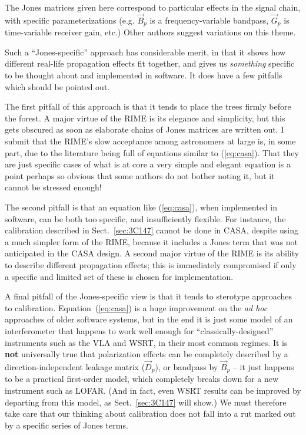 \documentclass[]{aa}
\newcommand{\jones}[2]{\vec {#1}_{#2}}
\begin{document}
The Jones matrices given here correspond to particular effects in the signal chain, with specific parameterizations (e.g. $\jones{B}{p}$ is a frequency-variable bandpass, $\jones{G}{p}$ is time-variable receiver gain, etc.) Other authors \citep{Rau:DDEs} suggest variations on this theme. 

Such a ``Jones-specific'' approach has considerable merit, in that it shows how different real-life propagation effects fit together, and gives us {\em something} specific to be thought about and implemented in software. It does have a few pitfalls which should be pointed out.

The first pitfall of this approach is that it tends to place the trees firmly before the forest. A major virtue of the RIME is its elegance and simplicity, but this gets obscured as soon as elaborate chains of Jones matrices are written out.  I submit that the RIME's slow acceptance among astronomers at large is, in some part, due to the literature being full of equations similar to (\ref{eq:casa}). That they are just specific cases of what is at core a very simple and elegant equation is a point perhaps so obvious that some authors do not bother noting it, but it cannot be stressed enough!

The second pitfall is that an equation like (\ref{eq:casa}), when implemented in software, can be both too specific, and insufficiently flexible. For instance, the calibration described in Sect.~\ref{sec:3C147} cannot be done in CASA, despite using a much simpler form of the RIME, because it includes a Jones term that was not anticipated in the CASA design. A second major virtue of the RIME is its ability to describe different propagation effects; this is immediately compromised if only a specific and limited set of these is chosen for implementation.

A final pitfall of the Jones-specific view is that it tends to sterotype approaches to calibration. Equation~(\ref{eq:casa}) is a huge improvement on the \emph{ad hoc} approaches of older software systems, but in the end it is just some model of an interferometer that happens to work well enough for ``classically-designed'' instruments such as the VLA and WSRT, in their most common regimes. It is {\bf not} universally true that polarization effects can be completely described by a direction-independent leakage matrix ($\jones{D}{p}$), or bandpass by $\jones{B}{p}$ -- it just happens to be a practical first-order model, which completely breaks down for a new instrument such as LOFAR. (And in fact, even WSRT results can be improved by departing from this model, as Sect.~\ref{sec:3C147} will show.) We must therefore take care that our thinking about calibration does not fall into a rut marked out by a specific series of Jones terms.
\end{document}

